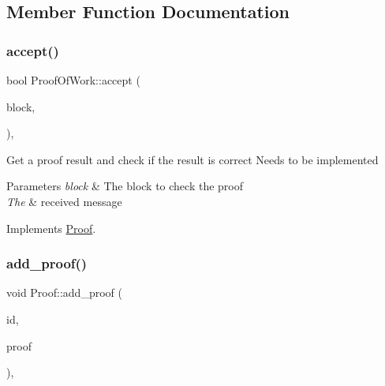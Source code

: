 \subsection{Member Function Documentation}
\mbox{\label{classProofOfWork_abe3dba92dad383eec07f70acccaa802d}} 
\subsubsection{\texorpdfstring{accept()}{accept()}}
{\footnotesize\ttfamily bool Proof\+Of\+Work\+::accept (\begin{DoxyParamCaption}\item[{\mbox{\hyperlink{classBlock}{Block}} $\ast$}]{block,  }\item[{\mbox{\hyperlink{classMessage}{Message}} $\ast$}]{ }\end{DoxyParamCaption})\hspace{0.3cm}{\ttfamily [override]}, {\ttfamily [virtual]}}

Get a proof result and check if the result is correct Needs to be implemented


\begin{DoxyParams}{Parameters}
{\em block} & The block to check the proof \\
\hline
{\em The} & received message \\
\hline
\end{DoxyParams}


Implements \mbox{\hyperlink{classProof_ad52fee058ea617a186133cb6a008fe6e}{Proof}}.

\mbox{\label{classProof_a71874539fdbcc93c15594b889c95225b}} 
\subsubsection{\texorpdfstring{add\+\_\+proof()}{add\_proof()}}
{\footnotesize\ttfamily void Proof\+::add\+\_\+proof (\begin{DoxyParamCaption}\item[{int}]{id,  }\item[{std\+::function$<$ \mbox{\hyperlink{classProof}{Proof}} $\ast$()$>$}]{proof }\end{DoxyParamCaption})\hspace{0.3cm}{\ttfamily [static]}, {\ttfamily [inherited]}}

